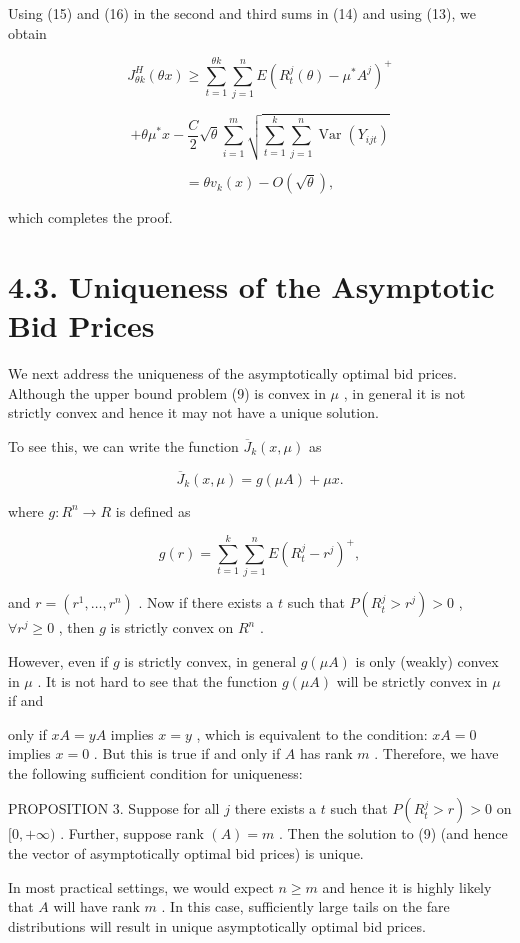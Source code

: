 Using (15) and (16) in the second and third sums in (14) and using (13),
we obtain

\[
J_{\theta k}^{H}(\theta x)\geq \sum_{t = 1}^{\theta k}\sum_{j = 1}^{n}E(R_{t}^{j}(\theta) - \mu^{*}A^{j})^{+}
\]

\[
+\theta \mu^{*}x - \frac{C}{2}\sqrt{\theta}\sum_{i = 1}^{m}\sqrt{\sum_{t = 1}^{k}\sum_{j = 1}^{n}\operatorname{Var}(Y_{ijt})}
\]

\[
= \theta v_{k}(x) - O(\sqrt{\theta}),
\]

which completes the proof.

\section{4.3. Uniqueness of the Asymptotic Bid
Prices}\label{uniqueness-of-the-asymptotic-bid-prices}

We next address the uniqueness of the asymptotically optimal bid prices.
Although the upper bound problem (9) is convex in \(\mu\) , in general
it is not strictly convex and hence it may not have a unique solution.

To see this, we can write the function \(\overline{J}_{k}(x,\mu)\) as

\[
\overline{J}_{k}(x,\mu) = g(\mu A) + \mu x. \tag{17}
\]

where \(g:R^{n}\to R\) is defined as

\[
g(r) = \sum_{t = 1}^{k}\sum_{j = 1}^{n}E(R_{t}^{j} - r^{j})^{+}, \tag{18}
\]

and \(r = (r^{1},\ldots ,r^{n})\) . Now if there exists a \(t\) such
that \(P(R_{t}^{j} > r^{j}) > 0\) , \(\forall r^{j}\geq 0\) , then \(g\)
is strictly convex on \(R^{n}\) .

However, even if \(g\) is strictly convex, in general \(g(\mu A)\) is
only (weakly) convex in \(\mu\) . It is not hard to see that the
function \(g(\mu A)\) will be strictly convex in \(\mu\) if and

only if \(xA = yA\) implies \(x = y\) , which is equivalent to the
condition: \(xA = 0\) implies \(x = 0\) . But this is true if and only
if \(A\) has rank \(m\) . Therefore, we have the following sufficient
condition for uniqueness:

PROPOSITION 3. Suppose for all \(j\) there exists a \(t\) such that
\(P(R_{t}^{j} > r) > 0\) on \([0, + \infty)\) . Further, suppose rank
\((A) = m\) . Then the solution to (9) (and hence the vector of
asymptotically optimal bid prices) is unique.

In most practical settings, we would expect \(n\geqslant m\) and hence
it is highly likely that \(A\) will have rank \(m\) . In this case,
sufficiently large tails on the fare distributions will result in unique
asymptotically optimal bid prices.

